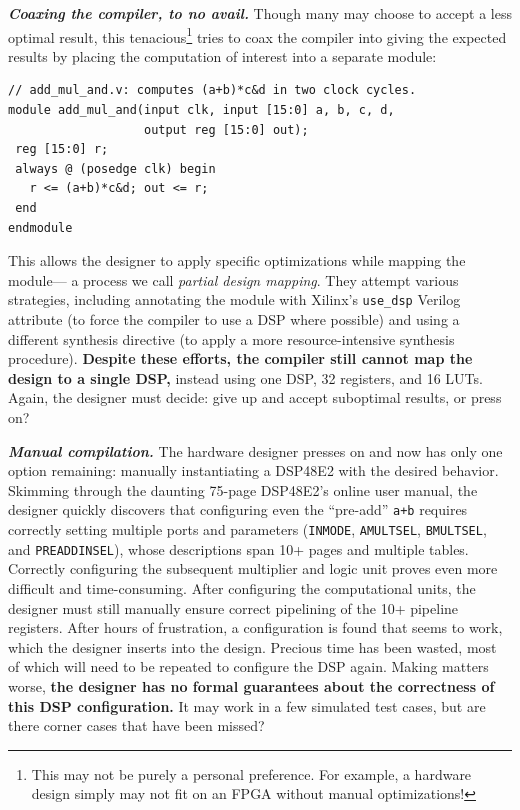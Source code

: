 \textit{\textbf{Coaxing the compiler, to no avail.}}
Though many 
may choose to accept a less optimal result,
 this tenacious\footnote{
This may not be purely a personal preference. %
For example, a hardware design simply may not fit on an FPGA
  without manual optimizations!}
  tries to coax
  the compiler into giving the 
  expected results
  by 
  placing the computation
  of interest into a separate module:

\begin{verbatim}
// add_mul_and.v: computes (a+b)*c&d in two clock cycles.
module add_mul_and(input clk, input [15:0] a, b, c, d,
                   output reg [15:0] out);
 reg [15:0] r;
 always @ (posedge clk) begin
   r <= (a+b)*c&d; out <= r;
 end
endmodule
\end{verbatim}

\noindent
This allows the designer
  to  apply
  specific optimizations while mapping
  the module---%
  a process we call \textit{partial design mapping}.
They attempt various strategies,
  including
  annotating the module with
  Xilinx's \texttt{use\_dsp} Verilog attribute
  (to force the compiler to use a DSP where possible)
  and using a different
  synthesis directive
  (to apply a more 
  resource-intensive synthesis
  procedure).
\textbf{Despite these efforts,
  the compiler still cannot 
  map the design
  to a single DSP,}
  instead using one DSP, 
  32 registers, and 16 LUTs.
Again, the designer must decide:
  give up and accept
  suboptimal results,
  or press on?

\textit{\textbf{Manual compilation.}}
The hardware designer presses on and
  now has only one option remaining:
  manually instantiating a DSP48E2
  with the desired behavior.
Skimming through the daunting 75-page DSP48E2's online user manual,
  the designer quickly discovers that
  configuring even
  the ``pre-add'' \texttt{a+b}
  requires correctly setting 
  multiple ports and parameters
  (\texttt{INMODE}, \texttt{AMULTSEL}, \texttt{BMULTSEL}, and \texttt{PREADDINSEL}),
  whose descriptions span 10+ pages and multiple tables.
Correctly configuring the subsequent multiplier
  and logic unit proves even more difficult
  and time-consuming.
After configuring the computational units,
  the designer must still manually ensure
  correct pipelining
  of the 10+ pipeline registers.
After hours
  of frustration,
  a configuration is found that 
  seems to work, which the designer
  inserts into the design.
Precious time has been wasted,
  most of which will need to be repeated
  to configure the DSP again.
Making matters worse,
  \textbf{the designer has no formal guarantees
  about the correctness of this DSP configuration.}
It may work in a few simulated test cases,
  but are there corner cases
  that have been missed?\tighten


